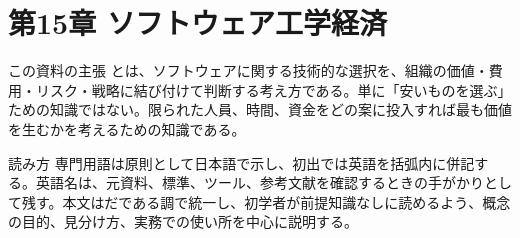\section{第15章 ソフトウェア工学経済}
\begin{pointbox}{この資料の主張}
とは、ソフトウェアに関する技術的な選択を、組織の価値・費用・リスク・戦略に結び付けて判断する考え方である。単に「安いものを選ぶ」ための知識ではない。限られた人員、時間、資金をどの案に投入すれば最も価値を生むかを考えるための知識である。
\end{pointbox}

\begin{notebox}{読み方}
専門用語は原則として日本語で示し、初出では英語を括弧内に併記する。英語名は、元資料、標準、ツール、参考文献を確認するときの手がかりとして残す。本文はだである調で統一し、初学者が前提知識なしに読めるよう、概念の目的、見分け方、実務での使い所を中心に説明する。
\end{notebox}
